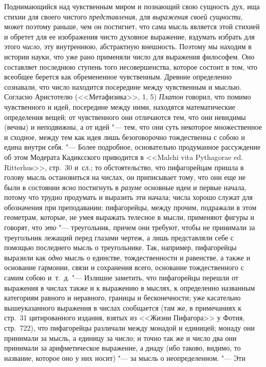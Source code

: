 Поднимающийся над чувственным миром и познающий свою сущность дух, ища стихии
для своего чистого {\em представления}, для {\em выражения своей сущности},
может поэтому раньше, чем он постигнет, что сама мысль является этой стихией и
обретет для ее изображения чисто духовное выражение, вздумать избрать для этого
{\em число}, эту внутреннюю, абстрактную внешность. Поэтому мы находим в
истории науки, что уже рано применяли число для выражения философем. Оно
составляет последнюю ступень того несовершенства, которое состоит в том, что
всеобщее берется как обремененное чувственным. Древние определенно сознавали,
что число находится посередине между чувственным и мыслью. Согласно Аристотелю
(<<Метафизика>>, 1, 5) {\em Платон} говорил, что помимо чувственного и идей,
посередине между ними, находятся математические определения вещей; от
чувственного они отличаются тем, что они невидимы (вечны) и неподвижны, а от
идей "--- тем, что они суть некоторое множественное и сходное, между тем как
идея лишь безоговорочно тождественна с собою и едина внутри себя. "--- Более
подробное, основательно продуманное рассуждение об этом Модерата Кадиксского
приводится в <<Malchi vita Pythagorae ed. Ritterhus>>, стр.~30 и~сл.; то
обстоятельство, что пифагорейцам пришла в голову мысль остановиться на числах,
он приписывает тому, что они еще не были в состоянии {\em ясно} постигнуть в
{\em разуме} основные идеи и первые начала, потому что трудно продумать и
выразить эти начала; числа хорошо служат для обозначения при преподавании;
пифагорейцы, между прочим, подражали в этом геометрам, которые, не умея
выражать телесное в мысли, применяют фигуры и говорят, что {\em это} "---
треугольник, причем они требуют, чтобы не принимали за треугольник лежащий
перед глазами чертеж, а лишь представляли себе с помощью последнего мысль о
треугольнике. Так, например, пифагорейцы выразили как {\em одно} мысль о
единстве, тождественности и равенстве, а также и основание гармонии, связи и
сохранения всего, основание тождественного с самим собою и~т.~д. "--- Излишне
заметить, что пифагорейцы перешли от выражения в числах также и к выражению в
мыслях, к определенно названным категориям равного и неравного, границы и
бесконечности; уже касательно вышеуказанного выражения в числах сообщается (там
же, в примечаниях к стр.~31 цитированного издания, взятых из <<Жизни Пифагора>>
у Фотия, стр.~722), что пифагорейцы различали между монадой и единицей; монаду
они принимали за мысль, а единицу за число; и точно так же и число два они
принимали за арифметическое выражение, а диаду (ибо таково, видимо, то
название, которое оно у них носит) "--- за мысль о неопределенном. "--- Эти
